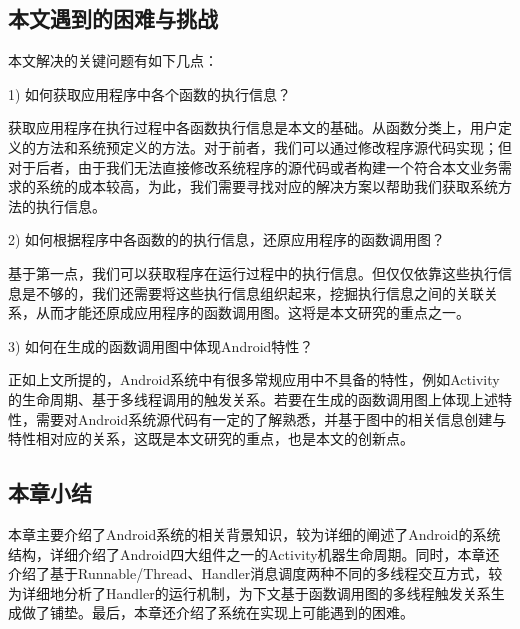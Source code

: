 \subsection{本文遇到的困难与挑战}


 本文解决的关键问题有如下几点：

1)	如何获取应用程序中各个函数的执行信息？

获取应用程序在执行过程中各函数执行信息是本文的基础。从函数分类上，用户定义的方法和系统预定义的方法。对于前者，我们可以通过修改程序源代码实现；但对于后者，由于我们无法直接修改系统程序的源代码或者构建一个符合本文业务需求的系统的成本较高，为此，我们需要寻找对应的解决方案以帮助我们获取系统方法的执行信息。

2)	如何根据程序中各函数的的执行信息，还原应用程序的函数调用图？

基于第一点，我们可以获取程序在运行过程中的执行信息。但仅仅依靠这些执行信息是不够的，我们还需要将这些执行信息组织起来，挖掘执行信息之间的关联关系，从而才能还原成应用程序的函数调用图。这将是本文研究的重点之一。

3)	如何在生成的函数调用图中体现Android特性？

正如上文所提的，Android系统中有很多常规应用中不具备的特性，例如Activity的生命周期、基于多线程调用的触发关系。若要在生成的函数调用图上体现上述特性，需要对Android系统源代码有一定的了解熟悉，并基于图中的相关信息创建与特性相对应的关系，这既是本文研究的重点，也是本文的创新点。

\subsection{ 本章小结}

本章主要介绍了Android系统的相关背景知识，较为详细的阐述了Android的系统结构，详细介绍了Android四大组件之一的Activity机器生命周期。同时，本章还介绍了基于Runnable/Thread、Handler消息调度两种不同的多线程交互方式，较为详细地分析了Handler的运行机制，为下文基于函数调用图的多线程触发关系生成做了铺垫。最后，本章还介绍了系统在实现上可能遇到的困难。
